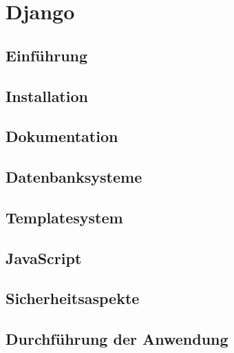 \chapter{Django}
\section{Einführung}
\section{Installation}
\section{Dokumentation}
\section{Datenbanksysteme}
\section{Templatesystem}
\section{JavaScript}
\section{Sicherheitsaspekte}
\section{Durchführung der Anwendung}
